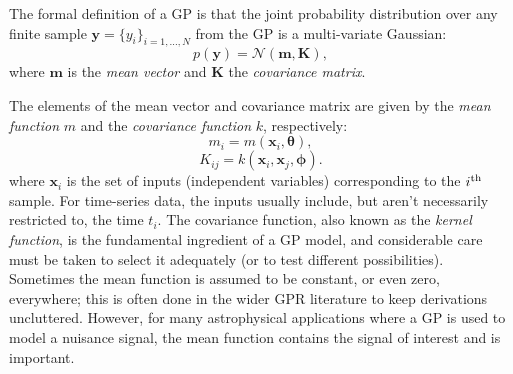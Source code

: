 \documentclass[letterpaper]{ar-1col}
\newcommand{\hyperparams}{\ensuremath{\boldsymbol{\phi}}}
\newcommand{\meanparams}{\ensuremath{\boldsymbol{\theta}}}
\begin{document}
The formal definition of a GP is that the joint probability distribution over any finite sample $\mathbf{y} = \{y_i\}_{i=1,\ldots,N}$ from the GP is a multi-variate Gaussian:
\begin{equation}
\label{eq:gp_def}
    p(\mathbf{y}) = \mathcal{N}(\mathbf{m}, \mathbf{K}),
\end{equation}
where $\mathbf{m}$ is the \emph{mean vector} and $\mathbf{K}$ the \emph{covariance matrix}.

The elements of the mean vector and covariance matrix are given by the \textit{mean function} $m$ and the \textit{covariance function} $k$, respectively:
\begin{equation}
    m_{i} = m(\boldsymbol{x}_i, \meanparams),
\end{equation}
\begin{equation}
    K_{ij} = k(\boldsymbol{x}_i,\boldsymbol{x}_j, \hyperparams).
\end{equation}
where $\boldsymbol{x}_i$ is the set of inputs (independent variables) corresponding to the $i^{\rm th}$ sample. For time-series data, the inputs usually include, but aren't necessarily restricted to, the time $t_i$. The covariance function, also known as the \emph{kernel function}, is the fundamental ingredient of a GP model, and considerable care must be taken to select it adequately (or to test different possibilities). Sometimes the mean function is assumed to be constant, or even zero, everywhere; this is often done in the wider GPR literature to keep derivations uncluttered. However, for many astrophysical applications where a GP is used to model a nuisance signal, the mean function contains the signal of interest and is important.

\end{document}
